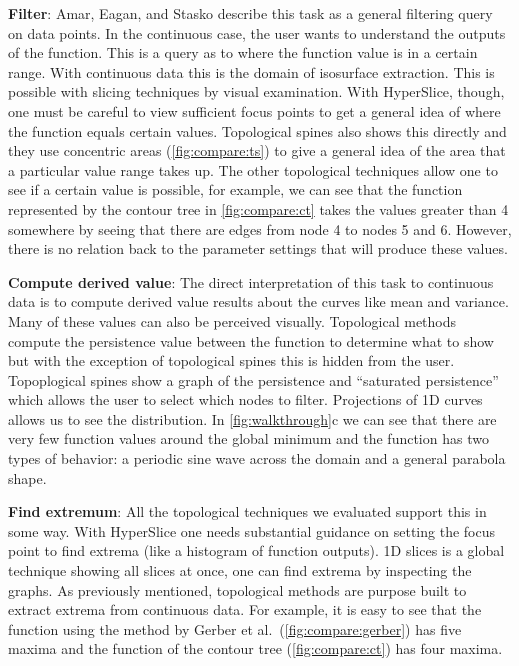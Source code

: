 \textbf{Filter}:\label{filter}
Amar, Eagan, and Stasko describe this task as a general filtering query on data points.
In the continuous case, the user wants to understand the outputs of the
function. This is a query as to where the function value is in a certain range.
With continuous data this is the domain of isosurface extraction.
This is possible with slicing techniques by visual examination.
With HyperSlice, though, one must be careful to view sufficient focus points to
get a general idea of where the function equals certain values.  Topological
spines also shows this directly and they use concentric areas 
(\autoref{fig:compare:ts}) to give a
general idea of the area that a particular value range takes up. The other
topological techniques allow one to see if a certain value is possible, for
example, we can see that the function represented by the contour tree in 
\autoref{fig:compare:ct} takes the values greater than 4 somewhere by seeing 
that there are edges from node 4 to nodes 5 and 6. However,
there is no relation back to the parameter settings that will produce these
values. 

\textbf{Compute derived value}:\label{compute-derived-value}
The direct interpretation of this task to continuous data is to compute derived
value results about the curves 
like mean and variance. Many of these values can
also be perceived visually.  Topological methods compute the persistence value
between the function to determine what to show but with the exception of
topological spines this is hidden from the user. Topoplogical spines show a
graph of the persistence and ``saturated persistence'' which allows the user
to select which nodes to filter.
Projections of 1D curves allows us to see the distribution.
In
\autoref{fig:walkthrough}c we can see that there are very few function values
around the global minimum and the function has two types of behavior: a
periodic sine wave across the domain and a general parabola shape.

\textbf{Find extremum}:\label{find-extremum}
All the topological techniques we evaluated support this in some
way. With HyperSlice one needs substantial guidance on setting the focus point to find
extrema (like a histogram of function outputs). %
1D slices is a global technique showing all slices at once, one can find
extrema by inspecting the graphs.
As previously mentioned, topological methods are purpose built to extract
extrema from continuous data. For example, it is easy to see that the function
using the method by Gerber et al.\ (\autoref{fig:compare:gerber}) has five
maxima and the function of the contour tree (\autoref{fig:compare:ct}) has four
maxima.

